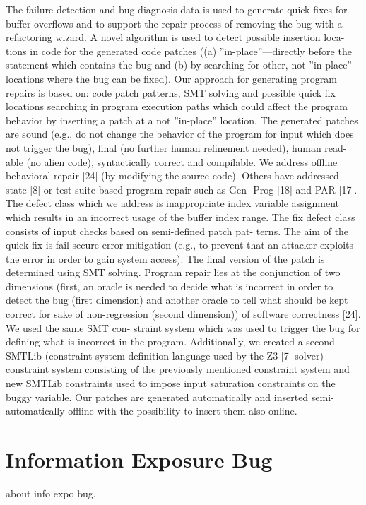 The failure detection and bug diagnosis data is used to generate quick fixes for
buffer overflows and to support the repair process of removing the bug with a
refactoring wizard. A novel algorithm is used to detect possible insertion loca-
tions in code for the generated code patches ((a) ”in-place”—directly before the
statement which contains the bug and (b) by searching for other, not ”in-place”
locations where the bug can be fixed). Our approach for generating program
repairs is based on: code patch patterns, SMT solving and possible quick fix
locations searching in program execution paths which could affect the program
behavior by inserting a patch at a not ”in-place” location. The generated patches
are sound (e.g., do not change the behavior of the program for input which does
not trigger the bug), final (no further human refinement needed), human read-
able (no alien code), syntactically correct and compilable.
We address offline behavioral repair [24] (by modifying the source code).
Others have addressed state [8] or test-suite based program repair such as Gen-
Prog [18] and PAR [17]. The defect class which we address is inappropriate index
variable assignment which results in an incorrect usage of the buffer index range.
The fix defect class consists of input checks based on semi-defined patch pat-
terns. The aim of the quick-fix is fail-secure error mitigation (e.g., to prevent
that an attacker exploits the error in order to gain system access). The final
version of the patch is determined using SMT solving.
Program repair lies at the conjunction of two dimensions (first, an oracle is
needed to decide what is incorrect in order to detect the bug (first dimension)
and another oracle to tell what should be kept correct for sake of non-regression
(second dimension)) of software correctness [24]. We used the same SMT con-
straint system which was used to trigger the bug for defining what is incorrect
in the program. Additionally, we created a second SMTLib (constraint system
definition language used by the Z3 [7] solver) constraint system consisting of the
previously mentioned constraint system and new SMTLib constraints used to
impose input saturation constraints on the buggy variable.
Our patches are generated automatically and inserted semi-automatically offline
with the possibility to insert them also online.




\section{Information Exposure Bug}
about info expo bug.
 
